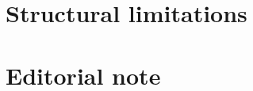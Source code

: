 \documentclass[epj,twocolumn]{svjour3}
\begin{document}
\section{Structural limitations}\label{sec:limits}

\section{Editorial note}\label{sec:editorial}

\begin{acknowledgements}
\end{acknowledgements}



\end{document}
